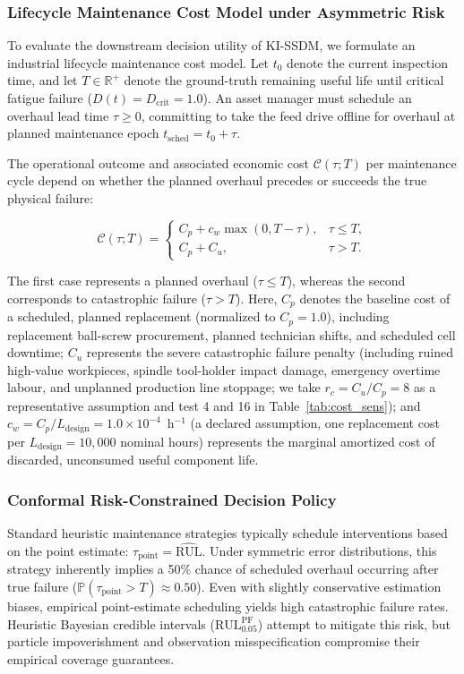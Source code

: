 \documentclass[a4paper,fleqn]{cas-dc}
\newcommand{\Dcrit}{D_{\mathrm{crit}}}
\newcommand{\R}{\mathbb{R}}
\begin{document}
\subsubsection{Lifecycle Maintenance Cost Model under Asymmetric Risk}
To evaluate the downstream decision utility of KI-SSDM, we formulate an industrial lifecycle maintenance cost model. Let $t_0$ denote the current inspection time, and let $T \in \R^+$ denote the ground-truth remaining useful life until critical fatigue failure ($D(t) = \Dcrit = 1.0$). An asset manager must schedule an overhaul lead time $\tau \ge 0$, committing to take the feed drive offline for overhaul at planned maintenance epoch $t_{\mathrm{sched}} = t_0 + \tau$.

The operational outcome and associated economic cost $\mathcal{C}(\tau; T)$ per maintenance cycle depend on whether the planned overhaul precedes or succeeds the true physical failure:

\begin{equation}
\label{eq:cost_model}
\mathcal{C}(\tau;T)=
\begin{cases}
C_p+c_w\max(0,T-\tau),
& \tau\leq T,\\[3pt]
C_p+C_u,
& \tau>T.
\end{cases}
\end{equation}

The first case represents a planned overhaul ($\tau\leq T$), whereas the second corresponds to catastrophic failure ($\tau>T$). Here, $C_p$ denotes the baseline cost of a scheduled, planned replacement (normalized to $C_p = 1.0$), including replacement ball-screw procurement, planned technician shifts, and scheduled cell downtime; $C_u$ represents the severe catastrophic failure penalty (including ruined high-value workpieces, spindle tool-holder impact damage, emergency overtime labour, and unplanned production line stoppage; we take $r_c = C_u / C_p = 8$ as a representative assumption and test 4 and 16 in Table~\ref{tab:cost_sens}); and $c_w = C_p / L_{\mathrm{design}} = 1.0 \times 10^{-4}$~h$^{-1}$ (a declared assumption, one replacement cost per $L_{\mathrm{design}} = 10{,}000$ nominal hours) represents the marginal amortized cost of discarded, unconsumed useful component life.


\subsubsection{Conformal Risk-Constrained Decision Policy}
Standard heuristic maintenance strategies typically schedule interventions based on the point estimate: $\tau_{\mathrm{point}} = \widehat{\mathrm{RUL}}$. Under symmetric error distributions, this strategy inherently implies a 50\% chance of scheduled overhaul occurring after true failure ($\mathbb{P}(\tau_{\mathrm{point}} > T) \approx 0.50$). Even with slightly conservative estimation biases, empirical point-estimate scheduling yields high catastrophic failure rates. Heuristic Bayesian credible intervals ($\mathrm{RUL}_{0.05}^{\mathrm{PF}}$) attempt to mitigate this risk, but particle impoverishment and observation misspecification compromise their empirical coverage guarantees.
\end{document}
